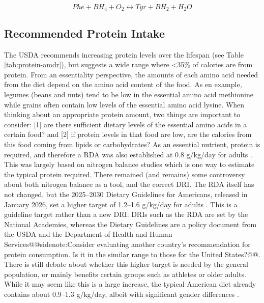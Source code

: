 \documentclass{tufte-handout}
\makeatletter
\def\sidenote#1{@@sidenote:#1@@}
\makeatother
\begin{document}
\begin{equation}
Phe + BH_4 + O_2\leftrightarrow Tyr + BH_2 + H_2O 
\end{equation}

\subsection{Recommended Protein Intake}

The USDA recommends increasing protein levels over the lifespan (see Table \ref{tab:protein-amdr}), but suggests a wide range where <35\% of calories are from protein.  From an essentiality perspective, the amounts of each amino acid needed from the diet depend on the amino acid content of the food.  As en example, legumes (beans and nuts) tend to be low in the essential amino acid methionine while grains often contain low levels of the essential amino acid lysine.  When thinking about an appropriate protein amount, two things are important to consider: [1] are there sufficient dietary levels of the essential amino acids in a certain  food? and [2] if protein levels in that food are low, are the calories from this food coming from lipids or carbohydrates?  As an essential nutrient, protein is required, and therefore a RDA was also established at 0.8 g/kg/day for adults \citep{InstituteofMedicine2005}.  This was largely based on nitrogen balance studies which is one way to estimate the typical protein required.  There remained (and remains) some controversy about both nitrogen balance as a tool, and the correct DRI.  The RDA itself has not changed, but the 2025--2030 Dietary Guidelines for Americans, released in January 2026, set a higher target of 1.2--1.6 g/kg/day for adults \citep{USDAHHS2025}.  This is a guideline target rather than a new DRI: DRIs such as the RDA are set by the National Academies, whereas the Dietary Guidelines are a policy document from the USDA and the Department of Health and Human Services\sidenote{Consider evaluating another country's recommendation for protein consumption.  Is it in the similar range to those for the United States?}.  There is still debate about whether this higher target is needed by the general population, or mainly benefits certain groups such as athletes or older adults.  While it may seem like this is a large increase, the typical American diet already contains about 0.9--1.3 g/kg/day, albeit with significant gender differences \citep{USDAFSRG2021}.
\end{document}
